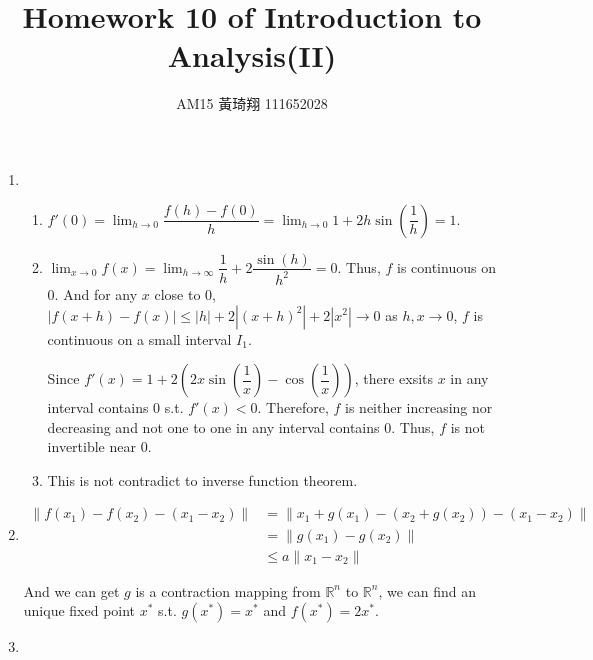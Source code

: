 \documentclass[12pt]{article}
\title{Homework 10 of Introduction to Analysis(II)}
\author{AM15 黃琦翔 111652028}
\begin{document}
\maketitle
\begin{enumerate}
    \item \begin{enumerate}
        \item $f'(0) = \displaystyle\lim_{h\to 0} \dfrac{f(h) - f(0)}{h} = \displaystyle\lim_{h\to 0} 1 + 2h\sin(\dfrac{1}{h}) = 1$.
        
        \item $\displaystyle\lim_{x\to 0} f(x) = \displaystyle\lim_{h\to \infty} \dfrac{1}{h} + 2\dfrac{\sin(h)}{h^2} = 0$.
        Thus, $f$ is continuous on $0$.
        And for any $x$ close to $0$, $|f(x+h) - f(x)| \leq |h| + 2|(x+h)^2| + 2|x^2| \to 0$ as $h, x \to 0$, $f$ is continuous on a small interval $I_1$.

        Since $f'(x) = 1 + 2(2x\sin(\dfrac{1}{x}) - \cos(\dfrac{1}{x}))$, there exsits $x$ in any interval contains $0$ s.t. $f'(x)< 0$.
        Therefore, $f$ is neither increasing nor decreasing and not one to one in any interval contains $0$.
        Thus, $f$ is not invertible near $0$.

        \item This is not contradict to inverse function theorem.
    \end{enumerate}

    \item \begin{align*}
        \| f(x_1) - f(x_2) - (x_1 - x_2)\| &= \| x_1 + g(x_1) - (x_2 + g(x_2)) - (x_1 - x_2) \| \\
        &= \| g(x_1) - g(x_2)\|\\
        &\leq a\| x_1 - x_2\|
    \end{align*}
 
    And we can get $g$ is a contraction mapping from $\mathbb{R}^n$ to $\mathbb{R}^n$,
    we can find an unique fixed point $x^*$ s.t. $g(x^*) = x^*$ and $f(x^*) = 2x^*$.
   
    \item 

\end{enumerate}
\end{document}
